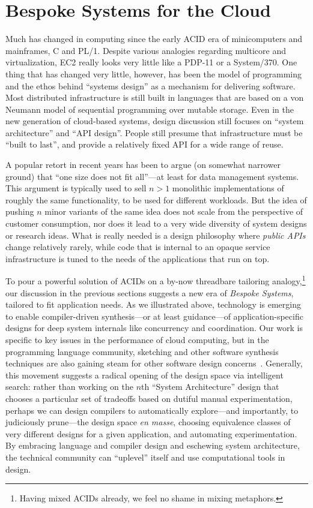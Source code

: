 \documentclass{sig-alternate}
\begin{document}
\section{Bespoke Systems for the Cloud}
Much has changed in computing since the early ACID era of minicomputers and mainframes, C and PL/1.  Despite various analogies regarding multicore and virtualization, EC2 really looks very little like a PDP-11 or a System/370.  One thing that has changed very little, however, has been the model of programming and the ethos behind ``systems design'' as a mechanism for delivering software.  Most distributed infrastructure is still built in languages that are based on a von Neumann model of sequential programming over mutable storage.  Even in the new generation of cloud-based systems, design discussion still focuses on ``system architecture'' and ``API design''.  People still presume that infrastructure must be ``built to last'', and provide a relatively fixed API for a wide range of reuse.  

A popular retort in recent years has been to argue (on somewhat narrower ground)
that ``one size does not fit all''---at least for data management systems.  This
argument is typically used to sell $n>1$ monolithic implementations of roughly the same functionality, to be used for different workloads.  But the idea of pushing $n$ minor variants of the same idea does not scale from the perspective of customer consumption, nor does it lead to a very wide diversity of system designs or research ideas.  What is really needed is a design philosophy where \emph{public APIs} change relatively rarely, while code that is internal to an opaque service infrastructure is tuned to the needs of the applications that run on top.

To pour a powerful solution of ACIDs on a by-now threadbare tailoring analogy,\footnote{Having mixed ACIDs already, we feel no shame in mixing metaphors.} our discussion in the previous sections suggests a new era of \emph{Bespoke Systems}, tailored to fit application needs.  As we illustrated above, technology is emerging to enable compiler-driven synthesis---or at least guidance---of application-specific designs for deep system internals like concurrency and coordination.  Our work is specific to key issues in the performance of cloud computing, but in the programming language community, sketching and other software synthesis techniques are also gaining steam for other software design concerns~\cite{Kuncak2012}.  Generally, this movement suggests a radical opening of the design space via intelligent search: rather than working on the $n$th ``System Architecture'' design that chooses a particular set of tradeoffs based on dutiful manual experimentation, perhaps we can design compilers to automatically explore---and importantly, to judiciously prune---the design space \emph{en masse}, choosing equivalence classes of very different designs for a given application, and automating experimentation.  By embracing language and compiler design and eschewing system architecture, the technical community can ``uplevel'' itself and use computational tools in design.
\end{document}

